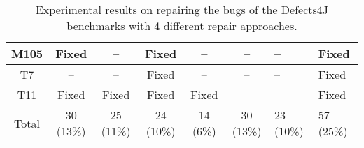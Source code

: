 \begin{table}[!t]
{\begin{tabular}{|c|c|c|c|c|c|}
M105              & Fixed     & --        & Fixed     & --        & --        & --        &Fixed   \\
\hline
T7                & --        & --        & Fixed     & --        & --        & --        &Fixed   \\
T11               & Fixed     & Fixed     & Fixed     & Fixed     & --        & --        &Fixed   \\
\hline
Total             & 30 (13\%) & 25 (11\%) & 24 (10\%) & 14 (6\%)  & 30 (13\%) & 23 (10\%) & 57 (25\%)\\
\hline 
\end{tabular}%
}
\caption{Experimental results on repairing the bugs of the Defects4J benchmarks with 4 different repair approaches.}
\end{table}
